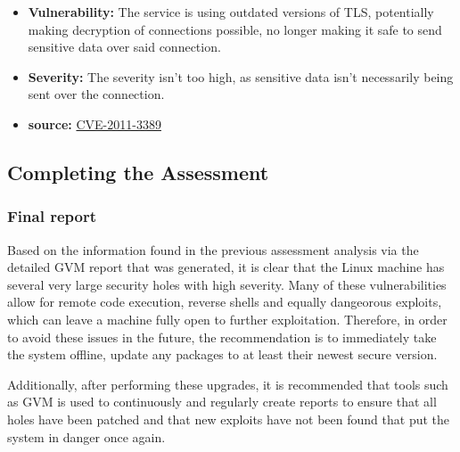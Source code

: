 \begin{itemize}
          \begin{itemize}
              \item \textbf{Vulnerability:} The service is using outdated versions of TLS, potentially making decryption of connections possible, no longer making it safe to send sensitive data over said connection.
              \item \textbf{Severity:} The severity isn't too high, as sensitive data isn't necessarily being sent over the connection.
              \item \textbf{source:} \href{https://cve.mitre.org/cgi-bin/cvename.cgi?name=CVE-2011-3389}{CVE-2011-3389}
          \end{itemize}
\end{itemize}

\subsection{Completing the Assessment}
\subsubsection{Final report}
Based on the information found in the previous assessment analysis via the detailed GVM report that was generated, it is clear that the Linux machine has several very large security holes with high severity. Many of these vulnerabilities allow for remote code execution, reverse shells and equally dangeorous exploits, which can leave a machine fully open to further exploitation. Therefore, in order to avoid these issues in the future, the recommendation is to immediately take the system offline, update any packages to at least their newest secure version.

Additionally, after performing these upgrades, it is recommended that tools such as GVM is used to continuously and regularly create reports to ensure that all holes have been patched and that new exploits have not been found that put the system in danger once again.